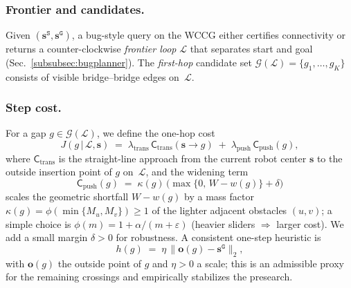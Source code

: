 \subsubsection{Frontier and candidates.}
Given $(\mathbf{s}^{\texttt{S}},\mathbf{s}^{\texttt{G}})$, 
a bug-style query on the WCCG either certifies connectivity or 
returns a counter-clockwise \emph{frontier loop} $\mathcal{L}$ 
that separates start and goal (Sec.~\ref{subsubsec:bugplanner}). 
The \emph{first-hop} candidate set $\mathcal{G}(\mathcal{L})=\{g_1,\dots,g_K\}$ 
consists of visible bridge–bridge edges on~$\mathcal{L}$.

\subsubsection{Step cost.}
For a gap $g\in\mathcal{G}(\mathcal{L})$, we define the one-hop cost
\begin{equation}\label{eq:step-cost}
J(g\,|\,\mathcal{L},\mathbf{s}) \;=\;
\lambda_{\mathrm{trans}}\,\mathsf{C}_{\mathrm{trans}}(\mathbf{s}\!\to\! g)
\;+\;
\lambda_{\mathrm{push}}\,\mathsf{C}_{\mathrm{push}}(g),
\end{equation}
where $\mathsf{C}_{\mathrm{trans}}$ is the straight-line approach from the current robot center $\mathbf{s}$ to the outside insertion point of $g$ on~$\mathcal{L}$, and the widening term
\begin{equation}\label{eq:push-cost}
\mathsf{C}_{\mathrm{push}}(g)
\;=\;
\kappa(g)\,\Big(\max\{0,\,W-w(g)\}+\delta\Big)
\end{equation}
scales the geometric shortfall $W-w(g)$ by a mass factor $\kappa(g)=\phi(\min\{M_u,M_v\})\ge 1$ of the lighter adjacent obstacles $(u,v)$; a simple choice is
$\phi(m)=1+\alpha/(m+\varepsilon)$ (heavier sliders $\Rightarrow$ larger cost). We add a small margin $\delta>0$ for robustness.  
A consistent one-step heuristic is
\begin{equation}\label{eq:gap-heuristic}
h(g) \;=\; \eta \,\big\|\mathbf{o}(g)-\mathbf{s}^{\texttt{G}}\big\|_2,
\end{equation}
with $\mathbf{o}(g)$ the outside point of $g$ and $\eta>0$ a scale; this is an admissible proxy for the remaining crossings and empirically stabilizes the presearch.

